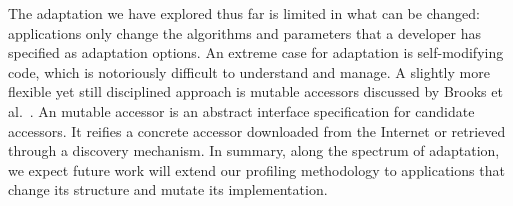 \documentclass[thesis.tex]{subfiles}
\begin{document}
 The adaptation we have explored thus far is
limited in what can be changed: applications only change the algorithms and
parameters that a developer has specified as adaptation options. An extreme case
for adaptation is self-modifying code, which is notoriously difficult to
understand and manage. A slightly more flexible yet still disciplined approach
is mutable accessors discussed by Brooks et al.~\cite{brooks2018component}. An
mutable accessor is an abstract interface specification for candidate
accessors. It reifies a concrete accessor downloaded from the Internet or
retrieved through a discovery mechanism. In summary, along the spectrum of
adaptation, we expect future work will extend our profiling methodology to
applications that change its structure and mutate its implementation.
\end{document}
